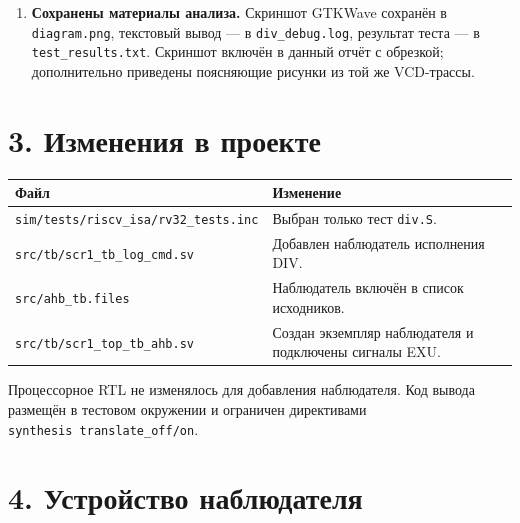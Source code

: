 \documentclass[
  russian,
]{article}
\newcounter{none} %
\begin{document}
\begin{enumerate}
\item \textbf{Сохранены материалы анализа.}
Скриншот GTKWave сохранён в \texttt{diagram.png}, текстовый вывод ---
в \texttt{div\_debug.log}, результат теста --- в
\texttt{test\_results.txt}. Скриншот включён в данный отчёт с обрезкой;
дополнительно приведены поясняющие рисунки из той же VCD-трассы.
\end{enumerate}

\section{3. Изменения в
проекте}\label{ux438ux437ux43cux435ux43dux435ux43dux438ux44f-ux432-ux43fux440ux43eux435ux43aux442ux435}

{\def\LTcaptype{none} %
\begin{longtable}[]{@{}
  >{\raggedright\arraybackslash}p{}
  >{\raggedright\arraybackslash}p{}@{}}
\toprule\noalign{}
\begin{minipage}[b]{\linewidth}\raggedright
Файл
\end{minipage} & \begin{minipage}[b]{\linewidth}\raggedright
Изменение
\end{minipage} \\
\midrule\noalign{}
\endhead
\bottomrule\noalign{}
\endlastfoot
\texttt{sim/tests/riscv\_isa/rv32\_tests.inc} & Выбран только тест
\texttt{div.S}. \\
\texttt{src/tb/scr1\_tb\_log\_cmd.sv} & Добавлен наблюдатель исполнения
DIV. \\
\texttt{src/ahb\_tb.files} & Наблюдатель включён в список исходников. \\
\texttt{src/tb/scr1\_top\_tb\_ahb.sv} & Создан экземпляр наблюдателя и
подключены сигналы EXU. \\
\end{longtable}
}

Процессорное RTL не изменялось для добавления наблюдателя. Код вывода
размещён в тестовом окружении и ограничен директивами
\texttt{synthesis\ translate\_off/on}.

\section{4. Устройство
наблюдателя}\label{ux443ux441ux442ux440ux43eux439ux441ux442ux432ux43e-ux43dux430ux431ux43bux44eux434ux430ux442ux435ux43bux44f}
\end{document}
